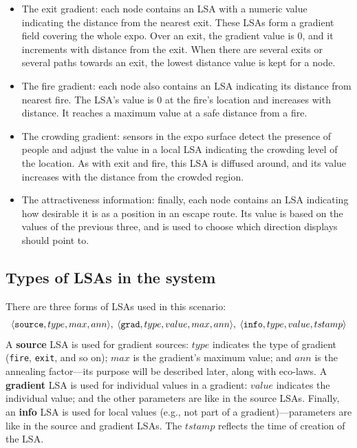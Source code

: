 \documentclass[12pt,a4paper,twoside,openright]{book}
\begin{document}
\begin{itemize}
\item{The exit gradient:} each node contains an LSA with a numeric value indicating the distance from the nearest exit. These LSAs form a gradient field covering the whole expo.
%
Over an exit, the gradient value is 0, and it increments with distance  from the exit. When there are several exits or several paths towards an exit, the lowest distance value is kept for a node.

\item{The fire gradient}: each node also contains an LSA indicating its distance from nearest fire. The LSA's value is 0 at the fire's location and increases with distance.
%
It reaches a maximum value at a safe distance from a fire.

\item{The crowding gradient:} sensors in the expo surface detect the presence of people and adjust the value in a local LSA indicating the crowding level of the location.
%
As with exit and fire, this LSA is diffused around, and its value increases with the distance from the crowded region.

\item{The attractiveness information:} finally, each node contains an LSA indicating how desirable it is as a position in an escape route.
%
Its value is based on the values of the previous three, and is used to choose which direction displays should point to.

\end{itemize}

\subsection{Types of LSAs in the system}

There are three forms of LSAs used in this scenario:
%
{\small \[\begin{array}{l}
\langle \mathtt{source}, type, max, ann\rangle,\;
\langle \mathtt{grad}, type, value, max, ann\rangle,\;
\langle \mathtt{info}, type, value, tstamp\rangle
\end{array}\]}%
%
\noindent A \textbf{source} LSA is used for gradient sources: $type$ indicates the type of gradient (\texttt{fire}, \texttt{exit}, and so on); $max$ is the gradient's maximum value; and $ann$ is the annealing factor---its purpose will be described later, along with eco-laws. 
%
A \textbf{gradient} LSA is used for individual values in a gradient: $value$ indicates the individual value; and the other parameters are like in the source LSAs.
%
Finally, an \textbf{info} LSA is used for local values (e.g., not part of a gradient)---parameters are like in the source and gradient LSAs. The $tstamp$ reflects the time of creation of the LSA.
\end{document}
